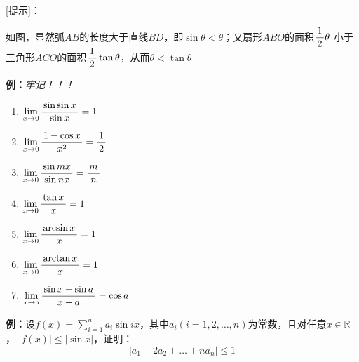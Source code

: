 {[提示]}：
\begin{center}
\end{center}

如图，显然弧$AB$的长度大于直线$BD$，即$\sin\theta<\theta$；又扇形$ABO$的面积$\df12\theta$
小于三角形$ACO$的面积$\df12\tan\theta$，从而$\theta<\tan\theta$

{\b{\bf 例：}{\it 牢记！！！}
\begin{enumerate}[(1)]
  \setlength{\itemindent}{1cm}
  \item $\limx{0}\df{\sin\sin x}{\sin x}=1$ 
  \item $\limx 0\df{1-\cos x}{x^2}=\df12$ 
  \item $\limx 0\df{\sin mx}{\sin nx}=\df mn$
  \item $\limx 0\df{\tan x}{x}=1$
  \item $\limx 0\df{\arcsin x}x=1$
  \item $\limx 0\df{\arctan x}x=1$
  \item $\limx a\df{\sin x-\sin a}{x-a}=\cos a$
\end{enumerate}}

{\bf 例：}设$f(x)=\sum\limits_{i=1}^na_i\sin
ix$，其中$a_i(i=1,2,\ldots,n)$为常数，且对任意$x\in\mathbb{R}$， $|f(x)|\leq |\sin x|$，证明：
$$\left|a_1+2a_2+\ldots+na_n\right|\leq 1$$

